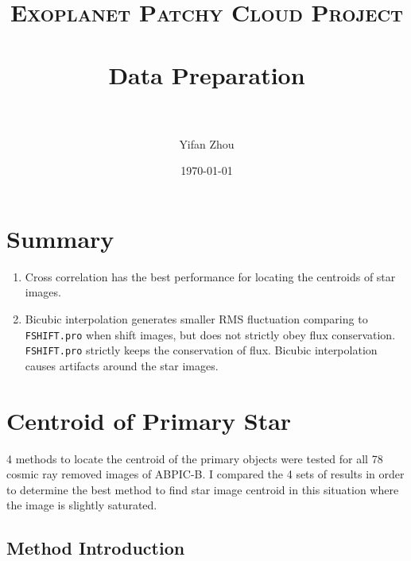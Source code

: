 \documentclass[paper=letter, fontsize=11pt]{scrartcl} %
\title{ 
\normalfont \normalsize 
\textsc{Exoplanet Patchy Cloud Project} \\ [25pt] %
\horrule{0.5pt} \\[0.4cm] %
\huge Data Preparation\\ %
\horrule{2pt} \\[0.5cm] %
}
\author{Yifan Zhou} %
\date{\normalsize\today} %
\numberwithin{equation}{section} %
\numberwithin{figure}{section} %
\numberwithin{table}{section} %
\begin{document}
\maketitle %
\section{Summary}
\begin{enumerate}
\item Cross correlation has the best performance for locating the
  centroids of star images.
\item Bicubic interpolation generates smaller RMS fluctuation
  comparing to \texttt{FSHIFT.pro} when shift images, but does not
  strictly obey flux conservation. \texttt{FSHIFT.pro} strictly keeps
  the conservation of flux. Bicubic interpolation causes artifacts
  around the star images.
\end{enumerate}

\section{Centroid of Primary Star}
4 methods to locate the centroid of the primary objects were tested
for all 78 cosmic ray removed images of ABPIC-B. I compared the 4 sets
of results in order to determine the best method to find star image
centroid in this situation where the image is slightly saturated.\par

\subsection{Method Introduction}
\end{document}
